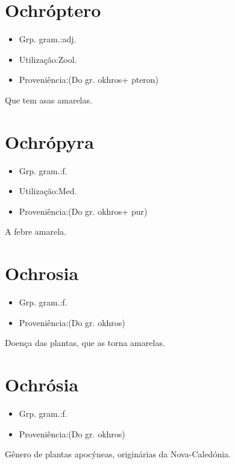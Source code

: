 \section{Ochróptero}
\begin{itemize}
\item {Grp. gram.:adj.}
\end{itemize}
\begin{itemize}
\item {Utilização:Zool.}
\end{itemize}
\begin{itemize}
\item {Proveniência:(Do gr. \textunderscore okhros\textunderscore  + \textunderscore pteron\textunderscore )}
\end{itemize}
Que tem asas amarelas.
\section{Ochrópyra}
\begin{itemize}
\item {Grp. gram.:f.}
\end{itemize}
\begin{itemize}
\item {Utilização:Med.}
\end{itemize}
\begin{itemize}
\item {Proveniência:(Do gr. \textunderscore okhros\textunderscore  + \textunderscore pur\textunderscore )}
\end{itemize}
A febre amarela.
\section{Ochrosia}
\begin{itemize}
\item {Grp. gram.:f.}
\end{itemize}
\begin{itemize}
\item {Proveniência:(Do gr. \textunderscore okhros\textunderscore )}
\end{itemize}
Doença das plantas, que as torna amarelas.
\section{Ochrósia}
\begin{itemize}
\item {Grp. gram.:f.}
\end{itemize}
\begin{itemize}
\item {Proveniência:(Do gr. \textunderscore okhros\textunderscore )}
\end{itemize}
Gênero de plantas apocýneas, originárias da Nova-Caledónia.
